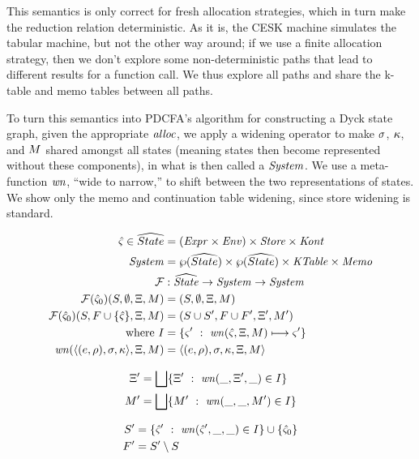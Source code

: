 This semantics is only correct for fresh allocation strategies, which in turn make the reduction relation deterministic.
%
As it is, the CESK machine simulates the tabular machine, but not the other way around;
%
if we use a finite allocation strategy, then we don't explore some non-deterministic paths that lead to different results for a function call.
%
We thus explore all paths and share the k-table and memo tables between all paths.

To turn this semantics into PDCFA's algorithm for constructing a Dyck state graph, given the appropriate $\mathit{alloc}$, we apply a widening operator to make $\sigma$, $\kappa$, and $M$ shared amongst all states (meaning states then become represented without these components), in what is then called a $\mathit{System}$. We use a meta-function $\mathit{wn}$, ``wide to narrow,'' to shift between the two representations of states.
%
We show only the memo and continuation table widening, since store widening is standard.
%

{
\setlength{\abovedisplayskip}{0pt}
\setlength{\belowdisplayskip}{4pt}
\setlength{\abovedisplayshortskip}{0pt}
\setlength{\belowdisplayshortskip}{8pt}
\begin{align*}
  \hat\varsigma \in \widehat{State} &= (\mathit{Expr} \times \mathit{Env}) \times \mathit{Store} \times \mathit{Kont} \\
  \mathit{System} &= \wp(\widehat{State}) \times \wp(\widehat{State}) \times \mathit{KTable} \times \mathit{Memo} \\
  {\mathcal F} &: \widehat{\mathit{State}} \to \mathit{System} \to \mathit{System} \\
  {\mathcal F}(\hat\varsigma_0)(S, \emptyset, \Xi, M) &= (S, \emptyset, \Xi, M) \\
  {\mathcal F}(\hat\varsigma_0)(S, F\cup\{ \hat\varsigma \}, \Xi, M) &= (S \cup S', F\cup F', \Xi', M') \\
  \text{where } I &= \{ \varsigma'\ :\ \mathit{wn}(\hat\varsigma,\Xi,M) \longmapsto \varsigma'\} \\
                \mathit{wn}(\langle (e,\rho),\sigma,\kappa \rangle,\Xi,M)
                   &= \langle (e,\rho),\sigma,\kappa,\Xi,M \rangle
\end{align*}
\begin{minipage}{.55\linewidth}
  \begin{align*}
    \Xi' &=  \bigsqcup\{ \Xi'\ :\ \mathit{wn}(\_, \Xi', \_) \in I\} \\
    M' &= \bigsqcup\{ M'\ :\ \mathit{wn}(\_, \_, M') \in I\}
  \end{align*}
\end{minipage}
\begin{minipage}{.40\linewidth}
  \begin{align*}
    S' &= \{ \hat\varsigma'\ :\ \mathit{wn}(\hat\varsigma', \_, \_) \in I\} \cup \{ \hat\varsigma_0 \}\\
    F' &= S' \setminus S
  \end{align*}
\end{minipage}
}

